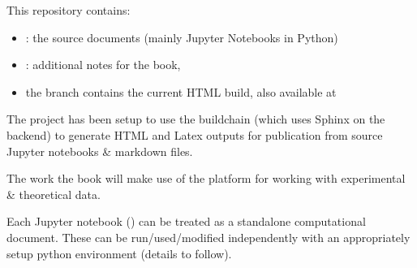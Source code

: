 \documentclass[letterpaper,table,10pt,english]{jupyterBook}
\begin{document}
\sphinxAtStartPar
This repository contains:
\begin{itemize}
\item {} 
\sphinxAtStartPar
{}: the source documents (mainly Jupyter Notebooks in Python)

\item {} 
\sphinxAtStartPar
{}: additional notes for the book,

\item {} 
\sphinxAtStartPar
the  branch contains the current HTML build, also available at 

\end{itemize}

\sphinxAtStartPar
The project has been setup to use the  build\sphinxhyphen{}chain (which uses Sphinx on the back\sphinxhyphen{}end) to generate HTML and Latex outputs for publication from source Jupyter notebooks \& markdown files.

\sphinxAtStartPar
The work  the book will make use of the  platform for working with experimental \& theoretical data.

\sphinxAtStartPar
{}

\begin{DUlineblock}{0em}
\item[] 
\end{DUlineblock}

\sphinxAtStartPar
Each Jupyter notebook () can be treated as a stand\sphinxhyphen{}alone computational document. These can be run/used/modified independently with an appropriately setup python environment (details to follow).

\begin{DUlineblock}{0em}
\item[] 
\end{DUlineblock}
\end{document}
